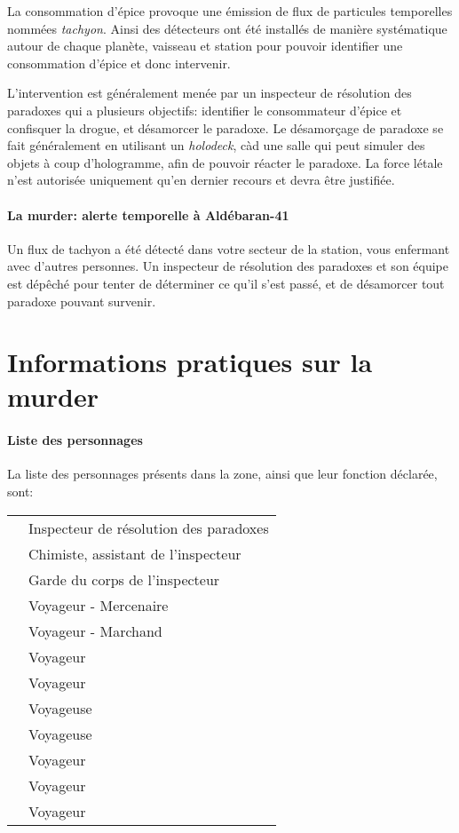 {{		%
		\par La consommation d'épice provoque une émission de flux de particules temporelles nommées \emph{tachyon}. Ainsi des détecteurs ont été installés de manière systématique autour de chaque planète, vaisseau et station pour pouvoir identifier une consommation d'épice et donc intervenir.
		
		\par L'intervention est généralement menée par un inspecteur de résolution des paradoxes qui a plusieurs objectifs: identifier le consommateur d'épice et confisquer la drogue, et désamorcer le paradoxe. Le désamorçage de paradoxe se fait généralement en utilisant un \emph{holodeck}, càd une salle qui peut simuler des objets à coup d'hologramme, afin de pouvoir réacter le paradoxe. La force létale n'est autorisée uniquement qu'en dernier recours et devra être justifiée.
		
		\paragraph{La murder: alerte temporelle à Aldébaran-41} Un flux de tachyon a été détecté dans votre secteur de la station, vous enfermant avec d'autres personnes. Un inspecteur de résolution des paradoxes et son équipe est dépêché pour tenter de déterminer ce qu'il s'est passé, et de désamorcer tout paradoxe pouvant survenir.
	}
	
	
	\section{Informations pratiques sur la murder}
	
	\paragraph{Liste des personnages} La liste des personnages présents dans la zone, ainsi que leur fonction déclarée, sont:
	\begin{center}
	\begin{tabular}{|l||l|}
		\hline
		\emph{\nmPlayerVII} & Inspecteur de résolution des paradoxes\\
		\emph{\nmPlayerXII} & Chimiste, assistant de l'inspecteur\\
		\emph{\nmPlayerVIII} & Garde du corps de l'inspecteur\\
		\hline
		\emph{\nmPlayerX} & Voyageur - Mercenaire\\
		\emph{\nmPlayerII} & Voyageur - Marchand\\
		\emph{\nmPlayerXI} & Voyageur\\
		\emph{\nmPlayerI} & Voyageur\\
		\emph{\nmPlayerIX} & Voyageuse\\
		\emph{\nmPlayerVI} & Voyageuse\\
		\emph{\nmPlayerIII} & Voyageur\\
		\emph{\nmPlayerIV} & Voyageur\\
		\emph{\nmPlayerV} & Voyageur\\
		\hline
	\end{tabular}
	\end{center}
	
}
